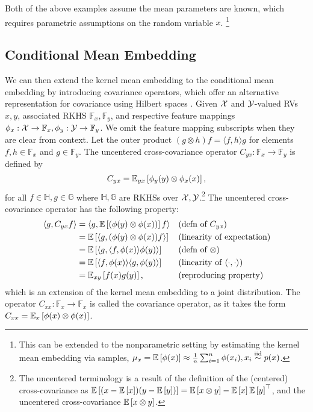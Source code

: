 \documentclass{article}
\begin{document}
Both of the above examples assume the mean parameters are known,
which requires parametric assumptions on the random variable $x$.
\footnote{This can be extended to the nonparametric setting by estimating the
kernel mean embedding via samples,
$\mu_x = \mathbb{E}\left[\phi(x)\right] \approx \frac{1}{n}\sum_{i=1}^n \phi(x_i), x_i\stackrel{\textrm{iid}}{\sim} p(x)$.}

\subsection{Conditional Mean Embedding}
We can then extend the kernel mean embedding to the conditional mean embedding
by introducing covariance operators, which offer an alternative
representation for covariance using Hilbert spaces \citep{baker1970,baker1973}.
Given $\mathcal{X}$ and $\mathcal{Y}$-valued RVs $x,y$, associated
RKHS $\mathbb{F}_x,\mathbb{F}_y$, and respective feature mappings
$\phi_x:\mathcal{X}\to\mathbb{F}_x,\phi_y:\mathcal{Y}\to\mathbb{F}_y$.
We omit the feature mapping subscripts when they are clear from context.
Let the outer product $(g \otimes h)f = \langle f,h\rangle g$ for elements
$f,h\in\mathbb{F}_x$ and $g\in\mathbb{F}_y$.
The uncentered cross-covariance operator $C_{yx}: \mathbb{F}_x\to\mathbb{F}_y$ is defined by
\begin{equation}
    \label{eqn:xcov}
    C_{yx} = \mathbb{E}_{yx}\left[\phi_y(y)\otimes\phi_x(x)\right],
\end{equation}
for all $f\in\mathbb{H},g\in\mathbb{G}$ where $\mathbb{H},\mathbb{G}$ are
RKHSs over $\mathcal{X},\mathcal{Y}$.\footnote{
The uncentered terminology is a result of the definition of the (centered) cross-covariance
as $\mathbb{E}\left[(x - \mathbb{E}\left[x\right])(y - \mathbb{E}\left[y\right])\right] = \mathbb{E}\left[x\otimes y\right] - \mathbb{E}\left[x\right]\mathbb{E}\left[y\right]^\top$,
and the uncentered cross-covariance $\mathbb{E}\left[x\otimes y\right]$.
}
The uncentered cross-covariance operator has the following property:
\begin{equation}
    \label{eqn:xcove}
    \begin{aligned}
    \langle g, C_{yx}f\rangle
    &= \langle g, \mathbb{E}\left[(\phi(y)\otimes\phi(x))\right]f\rangle && \text{(defn of }C_{yx})\\
    &= \mathbb{E}\left[\langle g, (\phi(y)\otimes\phi(x))f\rangle\right] && \text{(linearity of expectation)}\\
    &= \mathbb{E}\left[\langle g, \langle f, \phi(x)\rangle \phi(y)\rangle\right] && \text{(defn of }\otimes)\\
    &= \mathbb{E}\left[\langle f, \phi(x)\rangle\langle g, \phi(y)\rangle\right] && \text{(linearity of }\langle\cdot,\cdot\rangle)\\
    &= \mathbb{E}_{xy}\left[f(x)g(y)\right], && \text{(reproducing property)}
    \end{aligned}
\end{equation}
which is an extension of the kernel mean embedding to a joint distribution.
The operator $C_{xx}:\mathbb{F}_x\to\mathbb{F}_x$ is called the covariance operator,
as it takes the form $C_{xx} = \mathbb{E}_{x}\left[\phi(x)\otimes\phi(x)\right]$.
\end{document}
